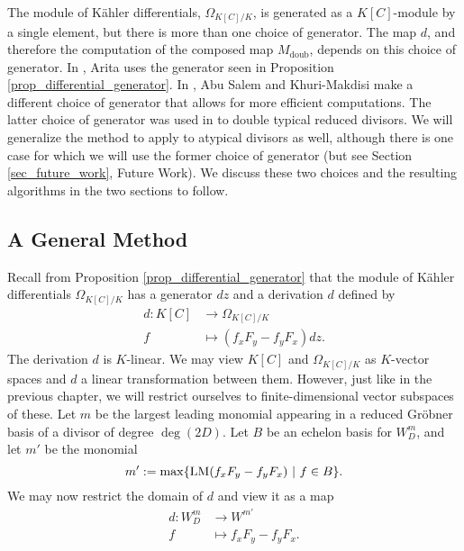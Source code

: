 The module of K\"ahler differentials, $\Omega_{K[C]/K}$, is generated as a $K[C]$-module by a single element,
but there is more than one choice of generator.
The map $d$, and therefore the computation of the composed map $M_{\text{doub}}$, depends on this choice of generator.
In \cite{arita05-2}, Arita uses the generator seen in Proposition \ref{prop_differential_generator}.
In \cite{salem07}, Abu Salem and Khuri-Makdisi make a different choice of generator
that allows for more efficient computations.
The latter choice of generator was used in \cite{salem07} to double typical reduced divisors.
We will generalize the method to apply to atypical divisors as well,
although there is one case for which we will use the former choice of generator
(but see Section \ref{sec_future_work}, Future Work).
We discuss these two choices and the resulting algorithms in the two sections to follow.




\subsection{A General Method}
\label{sec_slow_doubling}

Recall from Proposition \ref{prop_differential_generator}
that the module of K\"ahler differentials $\Omega_{K[C]/K}$ has a generator $dz$
and a derivation $d$ defined by
\begin{align*}
  d : K[C] &\to \Omega_{K[C]/K} \\
  f &\mapsto (f_xF_y - f_yF_x)dz.
\end{align*}
The derivation $d$ is $K$-linear.
We may view $K[C]$ and $\Omega_{K[C]/K}$ as $K$-vector spaces and $d$ a linear transformation between them.
However, just like in the previous chapter, we will restrict ourselves to finite-dimensional vector subspaces of these.
Let $m$ be the largest leading monomial appearing in a reduced Gr\"obner basis of a divisor of degree $\deg(2D)$.
Let $B$ be an echelon basis for $W_D^m$, and let $m'$ be the monomial
\[ m' := \max\{\operatorname{LM}(f_xF_y - f_yF_x) ~|~ f \in B \}. \]
We may now restrict the domain of $d$ and view it as a map
\begin{align*}
  d : W_D^m &\to W^{m'} \\
  f &\mapsto f_xF_y - f_yF_x.
\end{align*}

